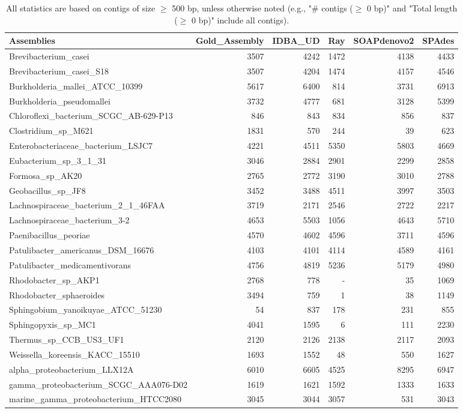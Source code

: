 \documentclass[12pt,a4paper]{article}
\begin{document}
\begin{table}[ht]
\begin{center}
\caption{All statistics are based on contigs of size $\geq$ 500 bp, unless otherwise noted (e.g., "\# contigs ($\geq$ 0 bp)" and "Total length ($\geq$ 0 bp)" include all contigs).}
\begin{tabular}{|l*{5}{|r}|}
\hline
Assemblies & Gold\_Assembly & IDBA\_UD & Ray & SOAPdenovo2 & SPAdes \\ \hline
Brevibacterium\_casei & 3507 & 4242 & 1472 & 4138 & 4433 \\ \hline
Brevibacterium\_casei\_S18 & 3507 & 4204 & 1474 & 4157 & 4546 \\ \hline
Burkholderia\_mallei\_ATCC\_10399 & 5617 & 6400 & 814 & 3731 & 6913 \\ \hline
Burkholderia\_pseudomallei & 3732 & 4777 & 681 & 3128 & 5399 \\ \hline
Chloroflexi\_bacterium\_SCGC\_AB-629-P13 & 846 & 843 & 834 & 856 & 837 \\ \hline
Clostridium\_sp\_M621 & 1831 & 570 & 244 & 39 & 623 \\ \hline
Enterobacteriaceae\_bacterium\_LSJC7 & 4221 & 4511 & 5350 & 5803 & 4669 \\ \hline
Eubacterium\_sp\_3\_1\_31 & 3046 & 2884 & 2901 & 2299 & 2858 \\ \hline
Formosa\_sp\_AK20 & 2765 & 2772 & 3190 & 3010 & 2788 \\ \hline
Geobacillus\_sp\_JF8 & 3452 & 3488 & 4511 & 3997 & 3503 \\ \hline
Lachnospiraceae\_bacterium\_2\_1\_46FAA & 3719 & 2171 & 2546 & 2722 & 2217 \\ \hline
Lachnospiraceae\_bacterium\_3-2 & 4653 & 5503 & 1056 & 4643 & 5710 \\ \hline
Paenibacillus\_peoriae & 4570 & 4602 & 4596 & 3711 & 4596 \\ \hline
Patulibacter\_americanus\_DSM\_16676 & 4103 & 4101 & 4114 & 4589 & 4161 \\ \hline
Patulibacter\_medicamentivorans & 4756 & 4819 & 5236 & 5179 & 4980 \\ \hline
Rhodobacter\_sp\_AKP1 & 2768 & 778 & - & 35 & 1069 \\ \hline
Rhodobacter\_sphaeroides & 3494 & 759 & 1 & 38 & 1149 \\ \hline
Sphingobium\_yanoikuyae\_ATCC\_51230 & 54 & 837 & 178 & 231 & 855 \\ \hline
Sphingopyxis\_sp\_MC1 & 4041 & 1595 & 6 & 111 & 2230 \\ \hline
Thermus\_sp\_CCB\_US3\_UF1 & 2120 & 2126 & 2138 & 2117 & 2093 \\ \hline
Weissella\_koreensis\_KACC\_15510 & 1693 & 1552 & 48 & 550 & 1627 \\ \hline
alpha\_proteobacterium\_LLX12A & 6010 & 6605 & 4525 & 8295 & 6947 \\ \hline
gamma\_proteobacterium\_SCGC\_AAA076-D02 & 1619 & 1621 & 1592 & 1333 & 1633 \\ \hline
marine\_gamma\_proteobacterium\_HTCC2080 & 3045 & 3044 & 3057 & 531 & 3043 \\ \hline
\end{tabular}
\end{center}
\end{table}
\end{document}
